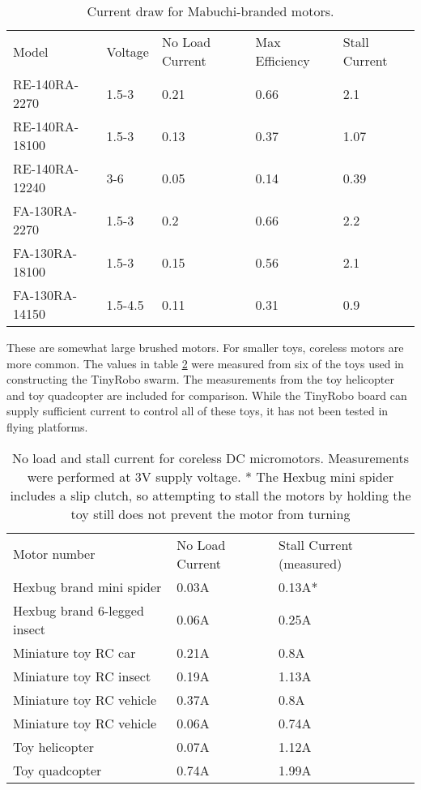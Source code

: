 \documentclass[]{article}
\begin{document}
\begin{table}
	\begin{tabular}{l|l|l|l|l}
	Model & Voltage & No Load Current & Max Efficiency & Stall Current\\
	RE-140RA-2270 & 1.5-3 & 0.21 & 0.66 & 2.1 \\
	RE-140RA-18100 & 1.5-3 & 0.13 & 0.37 & 1.07 \\
	RE-140RA-12240 & 3-6 & 0.05 & 0.14 & 0.39 \\
	FA-130RA-2270 & 1.5-3 & 0.2 & 0.66 & 2.2\\
	FA-130RA-18100 & 1.5-3 & 0.15 & 0.56 & 2.1\\
	FA-130RA-14150 & 1.5-4.5 & 0.11 & 0.31 & 0.9\\
	\end{tabular}
	\caption{Current draw for Mabuchi-branded motors.}
	\label{tab:properBrandedMotors}
\end{table}

These are somewhat large brushed motors. 
For smaller toys, coreless motors are more common. 
The values in table \ref{tab:coreless} were measured from six of the toys used in constructing the TinyRobo swarm.
The measurements from the toy helicopter and toy quadcopter are included for comparison.
While the TinyRobo board can supply sufficient current to control all of these toys, it has not been tested in flying platforms.

\begin{table}
	\begin{tabular}{l|l|l}
	Motor number & No Load Current & Stall Current (measured)\\
	Hexbug brand mini spider & 0.03A & 0.13A* \\
	Hexbug brand 6-legged insect & 0.06A & 0.25A \\
	Miniature toy RC car & 0.21A & 0.8A \\
	Miniature toy RC insect & 0.19A & 1.13A \\
	Miniature toy RC vehicle & 0.37A & 0.8A \\
	Miniature toy RC vehicle & 0.06A & 0.74A \\
	Toy helicopter & 0.07A & 1.12A \\
	Toy quadcopter & 0.74A & 1.99A \\
	\end{tabular}
	\caption{No load and stall current for coreless DC micromotors. Measurements were performed at 3V supply voltage. * The Hexbug mini spider includes a slip clutch, so attempting to stall the motors by holding the toy still does not prevent the motor from turning}
	\label{tab:coreless}
\end{table}
\end{document}
